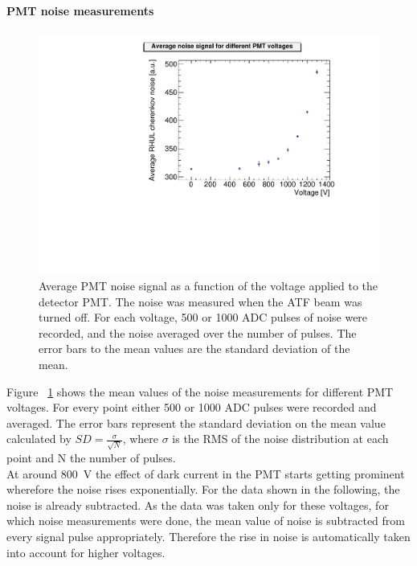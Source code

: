 \paragraph{PMT noise measurements}
\begin{figure}
\centering
\includegraphics[width=\textwidth]{Figures/AverageNoise_perVoltage_08April.pdf}
\caption[RHUL Cherenkov detector noise]{Average PMT noise signal as a function of the voltage applied to the detector PMT. The noise was measured when the ATF beam was turned off. For each voltage, 500 or 1000 ADC pulses of noise were recorded, and the noise averaged over the number of pulses. The error bars to the mean values are the standard deviation of the mean.}
\label{fig:AverageNoise}
\end{figure}
Figure ~\ref{fig:AverageNoise} shows the mean values of the noise measurements for different PMT voltages. For every point either 500 or 1000 ADC pulses were recorded and averaged. The error bars represent the standard deviation on the mean value calculated by $SD=\frac{\sigma}{\sqrt{N}}$, where $\sigma$ is the RMS of the noise distribution at each point and N the number of pulses.\\
At around \SI{800}{\volt} the effect of dark current in the PMT starts getting prominent wherefore the noise rises exponentially. For the data shown in the following, the noise is already subtracted. As the data was taken only for these voltages, for which noise measurements were done, the mean value of noise is subtracted from every signal pulse appropriately. Therefore the rise in noise is automatically taken into account for higher voltages.

